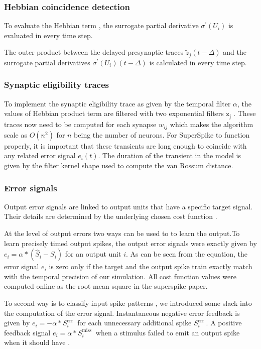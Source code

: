 \documentclass[12pt]{report}
\begin{document}
\subsubsection{Hebbian coincidence detection}
To evaluate the Hebbian term , the surrogate partial derivative $\sigma^{\prime}\left(U_{i}\right)$ is evaluated in every time step. 

The outer product between the delayed presynaptic traces $\tilde{z}_{j}(t-\Delta)$ and the surrogate partial derivatives $\sigma^{\prime}\left(U_{i}\right)(t-\Delta)$ is calculated in every time step.
\subsubsection{Synaptic eligibility traces}
To implement the synaptic eligibility trace as given by the temporal filter $\alpha$, the values of Hebbian product term are filtered with two exponential filters z\textsubscript{j} . These traces now need to be computed for each synapse $w_{i j}$ which makes the algorithm scale as $O\left(n^{2}\right)$ for $n$ being the number of neurons. For SuperSpike to function properly, it is important that these transients are long enough to coincide with any related error signal $e_{i}(t)$. The duration of the transient in the model is given by the filter kernel shape used to compute the van Rossum distance.
\subsubsection{Error signals}
Output error signals are linked to output units that have a specific target signal. Their details are determined by the underlying chosen cost function . 

At the level of output errors two ways can be used to to learn the output.To learn precisely timed output spikes, the output error signals were exactly given by $e_{i}=\alpha *\left(\hat{S}_{i}-S_{i}\right)$ for an output unit $i$. As can be seen from the equation, the error signal $e_{i}$ is zero only if the target and the output spike train exactly match with the temporal precision of our simulation. All cost function values were computed online as the root mean square in the superspike paper.

To second way is to classify input spike patterns , we introduced some slack into the computation of the error signal. Instantaneous negative error feedback is given by $e_{i}=-\alpha * S_{i}^{\text {err }}$ for each unnecessary additional spike $S_{i}^{\text {err }}$. A positive feedback signal $e_{i}=\alpha * S_{i}^{\text {miss }}$ when a stimulus failed to emit an output spike when it should have .
\end{document}
